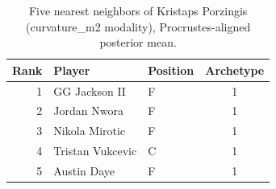 \begin{table}[htbp]
  \centering\small
  \begin{tabular}{rllc}
    \toprule
    Rank & Player & Position & Archetype \\
    \midrule
    1 & GG Jackson II & F & 1 \\
    2 & Jordan Nwora & F & 1 \\
    3 & Nikola Mirotic & F & 1 \\
    4 & Tristan Vukcevic & C & 1 \\
    5 & Austin Daye & F & 1 \\
    \bottomrule
  \end{tabular}
  \caption{Five nearest neighbors of Kristaps Porzingis (curvature_m2 modality), Procrustes-aligned posterior mean.}
  \label{tab:Kristaps_Porzingis_neighbors_curvature_m2}
\end{table}

